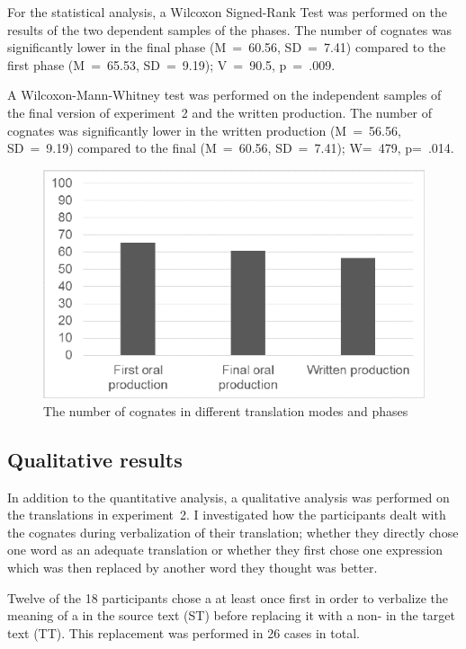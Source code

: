 \documentclass[output=paper]{LSP/langsci}
\begin{document}
For the statistical analysis, a Wilcoxon Signed-Rank Test was performed on the results of the two dependent samples of the  phases. The number of cognates was significantly lower in the final  phase (M~=~60.56, SD~=~7.41) compared to the first  phase (M~=~65.53, SD~=~9.19); V~=~90.5, p~=~.009.

A Wilcoxon-Mann-Whitney test was performed on the independent samples of the final version of experiment~2 and the written production. The number of cognates was significantly lower in the written production (M~=~56.56, SD~=~9.19) compared to the final  (M~=~60.56, SD~=~7.41); W=~479, p=~.014.

\begin{figure}
	
 	\includegraphics[width=.5\textwidth]{figures/oster/figure4.pdf}
 	\caption{The number of cognates in different translation modes and phases\protect\footnotemark}
 	\label{oster:fig:4}
\end{figure}

\subsection{Qualitative results}\label{oster:sec:3.2}
In addition to the quantitative analysis, a qualitative analysis was performed on the translations in experiment~2. I investigated how the participants dealt with the cognates during verbalization of their translation; whether they directly chose one word as an adequate translation or whether they first chose one expression which was then replaced by another word they thought was better. 

Twelve of the 18 participants chose a   at least once first in order to verbalize the meaning of a  in the source text (ST) before replacing it with a non- in the target text (TT). This replacement was performed in 26 cases in total. 
\end{document}
